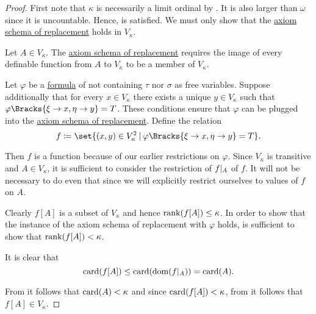 \begin{proof}
  First note that \( \kappa \) is necessarily a limit ordinal by . It is also larger than \( \omega \) since it is uncountable. Hence,  is satisfied. We must only show that the \hyperref[def:zfc/replacement]{axiom schema of replacement} holds in \( V_\kappa \).

  Let \( A \in V_\kappa \). The \hyperref[def:zfc/replacement]{axiom schema of replacement} requires the image of every definable function from \( A \) to \( V_\kappa \) to be a member of \( V_\kappa \).

  Let \( \varphi \) be a \hyperref[def:first_order_syntax/formula]{formula} of \hyperref[def:zfc]{} not containing \( \tau \) nor \( \sigma \) as free variables. Suppose additionally that for every \( x \in V_\kappa \) there exists a unique \( y \in V_\kappa \) such that \( \varphi\Bracks{\xi \to x, \eta \to y} = T \). These conditions ensure that \( \varphi \) can be plugged into the \hyperref[def:zfc/replacement]{axiom schema of replacement}. Define the relation
  \begin{equation*}
    f \coloneqq \set{ (x, y) \in V_\kappa^2 \given \varphi\Bracks{\xi \to x, \eta \to y} = T }.
  \end{equation*}

  Then \( f \) is a function because of our earlier restrictions on \( \varphi \). Since \( V_\kappa \) is transitive and \( A \in V_\kappa \), it is sufficient to consider the restriction of \( f\vert_A \) of \( f \). It will not be necessary to do even that since we will explicitly restrict ourselves to values of \( f \) on \( A \).

  Clearly \( f[A] \) is a subset of \( V_\kappa \) and hence \( \operatorname{rank}(f[A]) \leq \kappa \). In order to show that the instance of the axiom schema of replacement with \( \varphi \) holds, is sufficient to show that \( \operatorname{rank}(f[A]) < \kappa \).

  It is clear that
  \begin{equation*}
    \operatorname{card}(f[A]) \leq \operatorname{card}(\operatorname{dom}(f\vert_A)) = \operatorname{card}(A).
  \end{equation*}

  From  it follows that \( \operatorname{card}(A) < \kappa \) and since \( \operatorname{card}(f[A]) < \kappa \), from  it follows that \( f[A] \in V_\kappa \).
\end{proof}

